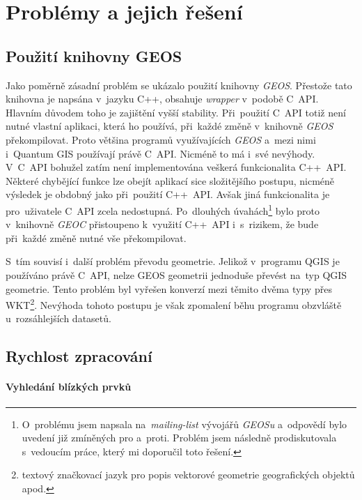 \chapter{Problémy a jejich řešení}
\label{7-problemy}

\section{Použití knihovny GEOS}
\label{problemy-geos}
Jako poměrně zásadní problém se ukázalo použití knihovny \textit{GEOS}. 
Přestože tato knihovna je napsána v~jazyku C++, obsahuje \textit{wrapper} 
v~podobě C~API. Hlavním důvodem toho je zajištění vyšší 
stability. Při~použití C~API totiž není nutné vlastní aplikaci,
která ho používá, při~každé změně v~knihovně \textit{GEOS} překompilovat. 
Proto většina programů využívajících \textit{GEOS} a~mezi nimi i~Quantum 
GIS používají právě C~API. Nicméně to má i~své nevýhody. V~C~API bohužel 
zatím není implementována veškerá funkcionalita C++~API. Některé chybějící 
funkce lze obejít aplikací sice složitějšího postupu, nicméně výsledek je 
obdobný jako při~použití C++~API. Avšak jiná funkcionalita je pro~uživatele 
C~API zcela nedostupná. Po~dlouhých úvahách\footnote{O~problému jsem napsala
na~\textit{mailing-list} vývojářů \textit{GEOSu} a~odpovědí bylo uvedení 
již zmíněných pro a~proti. Problém jsem následně prodiskutovala s~vedoucím 
práce, který mi doporučil toto řešení.} bylo proto v~knihovně \textit{GEOC} 
přistoupeno k~využití C++~API i~s~rizikem, že bude při~každé změně nutné 
vše překompilovat. %

S~tím souvisí i~další problém převodu geometrie. Jelikož v~programu QGIS je 
používáno právě C~API, nelze GEOS geometrii jednoduše převést na~typ QGIS 
geometrie. Tento problém byl vyřešen konverzí mezi těmito dvěma typy přes 
WKT\footnote{textový značkovací jazyk pro popis vektorové 
geometrie geografických objektů apod.}. Nevýhoda tohoto postupu je však 
zpomalení běhu programu obzvláště u~rozsáhlejších datasetů. 


\section{Rychlost zpracování}
\label{problemy-rychlost}

\subsubsection{Vyhledání blízkých prvků}

